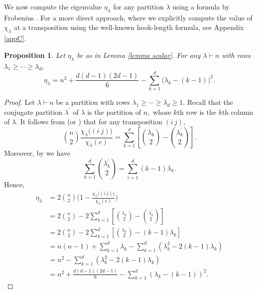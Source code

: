 \documentclass[12pt,dvipsnames,accepted=2016-08-18,a4paper,onecolumn]{quantumarticle}
\renewcommand{\qedsymbol}{\rule[.12ex]{1.2ex}{1.2ex}}
\numberwithin{equation}{section}
\newtheorem{proposition}[theorem]{Proposition}
\theoremstyle{definition}
\begin{document}
We now compute the eigenvalue $\eta_\lambda$ for any partition $\lambda$ using a formula by Frobenius \cite{Fro01}. For a more direct approach, where we explicitly compute the value of $\chi_\lambda$ at a transposition using the well-known hook-length formula, see Appendix \ref{appC}.

\begin{proposition} \label{prop:etaD}
Let $\eta_\lambda$ be as in Lemma \ref{lemma scalar}. For any $\lambda \vdash n$ with rows $\lambda_1\ge\cdots\ge \lambda_d$,
\begin{equation}\label{eq:etaD}
\eta_\lambda=
n^2 +\frac{d(d-1)(2d-1)}{6}
-\sum_{k=1}^d\big( \lambda_k - (k-1)\big)^2.
\end{equation}
\end{proposition}

\begin{proof}
Let $\lambda \vdash n$ be a partition with rows $\lambda_1\ge\cdots\ge \lambda_d\geq1.$
    Recall that the conjugate partition $\lambda^\prime$ of $\lambda$ is the partition of $n,$ whose $k$th row is the $k$th column of $\lambda.$ It follows from \cite[p.~534]{Fro01} (or \cite[Theorem 4]{Lassalle}) that for any transposition $(i\,j),$
    $$
    \binom{n}{2} \frac{\chi_\lambda\big((i\ j)\big)}{\chi_\lambda(e)} = 
    \sum_{k=1}^d \left[ \binom{\lambda_k}{2} - \binom{\lambda^\prime_k}{2}    \right].
    $$
    Moreover, by \cite[Proposition 1.8.3]{Sta99} we have
    $$
   \sum_{k=1}^d  \binom{\lambda^\prime_k}{2} = \sum_{i=1}^d (k-1)\lambda_k.
    $$
    Hence,
    \begin{align*}
        \eta_\lambda & = 2 \binom{n}{2} \bigg(1-\frac{\chi_\lambda\big((i\ j)\big)}{\chi_\lambda(e)}\bigg)\\
        & = 2 \binom{n}{2} - 2 \sum_{k=1}^d \left[ \binom{\lambda_k}{2} - \binom{\lambda^\prime_k}{2}    \right]\\
        & = 2 \binom{n}{2} - 2 \sum_{k=1}^d \left[ \binom{\lambda_k}{2} -  (k-1)\lambda_k  \right]\\
        & = n(n-1) + \sum_{k=1}^d \lambda_k - \sum_{k=1}^d \left(\lambda_k^2 - 2(k-1)\lambda_k\right) \\
        & =  n^2 - \sum_{k=1}^d \left(\lambda_k^2 - 2(k-1)\lambda_k\right)\\
        & = n^2 + \frac{d(d-1)(2d-1)}{6} - \sum_{k=1}^d \left(\lambda_k - (k-1)\right)^2.\tag*{\qed}
    \end{align*}
    \renewcommand{\qedsymbol}{}
\end{proof}
\end{document}
